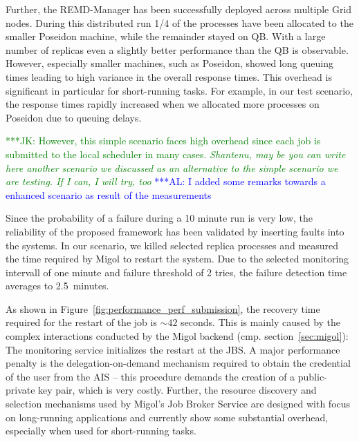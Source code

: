 \documentclass[conference,final]{IEEEtran}
\newcommand{\kimnote}[1]{ {\textcolor{green} { ***JK: #1 }}}
\newcommand{\alnote}[1]{ {\textcolor{blue} { ***AL: #1 }}}
\newcommand{\kimnote}[1]{}
\newcommand{\alnote}[1]{}
\begin{document}

Further, the REMD-Manager has been successfully deployed across
multiple Grid nodes. During this distributed run 1/4 of the processes have been 
allocated to the smaller Poseidon machine, while the remainder stayed on QB.
With a large number of replicas even a slightly better performance than the QB 
is observable. However, especially smaller machines, such as Poseidon, showed long queuing times 
leading to high variance in the overall response times. This overhead is significant in particular 
for short-running tasks. For example, in our test scenario, 
the response times rapidly increased when we allocated
more processes on Poseidon due to queuing delays. 

\kimnote{However, this simple scenario faces high overhead since each
  job is submitted to the local scheduler in many cases. \it
  Shantenu, may be you can write here another scenario we discussed
  as an alternative to the simple scenario we are testing.  If I can,
  I will try, too }            
\alnote{I added some remarks towards a enhanced scenario as result of the measurements}  
  

Since the probability of a failure during a 10 minute run is very low,
the reliability of the proposed framework has been validated by 
inserting faults into the
systems. In our scenario, we killed selected replica processes and
measured the time required by Migol to restart the system.  Due to
the selected monitoring intervall of one minute and failure threshold
of 2 tries, the failure detection time averages to 2.5\, minutes.

As shown in Figure~\ref{fig:performance_perf_submission}, the recovery
time required for the restart of the job is $\sim42$ seconds. This is
mainly caused by the complex interactions conducted by the Migol
backend (cmp. section~\ref{sec:migol}): The monitoring service
initializes the restart at the JBS.  A major performance penalty is
the delegation-on-demand mechanism required to obtain the credential
of the user from the AIS -- this procedure demands the creation of a
public-private key pair, which is very costly. Further, the resource
discovery and selection mechanisms used by Migol's Job Broker Service are designed 
with focus on long-running applications and currently show some substantial 
overhead, especially when used for short-running tasks.
\end{document}
